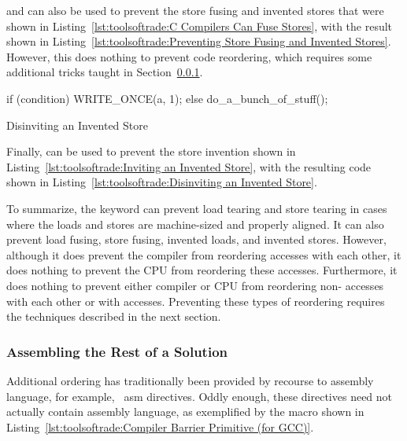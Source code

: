  and  can also be used to prevent the
store fusing and invented stores that were shown in
Listing~\ref{lst:toolsoftrade:C Compilers Can Fuse Stores},
with the result shown in
Listing~\ref{lst:toolsoftrade:Preventing Store Fusing and Invented Stores}.
However, this does nothing to prevent code reordering, which requires
some additional tricks taught in
Section~\ref{sec:toolsoftrade:Assembling the Rest of a Solution}.

\begin{listing}[tbp]
\begin{linelabel}
\begin{VerbatimL}[commandchars=\\\{\}]
if (condition)
	WRITE_ONCE(a, 1);
else
	do_a_bunch_of_stuff();
\end{VerbatimL}
\end{linelabel}
\caption{Disinviting an Invented Store}
\label{lst:toolsoftrade:Disinviting an Invented Store}
\end{listing}

Finally,  can be used to prevent the store invention
shown in
Listing~\ref{lst:toolsoftrade:Inviting an Invented Store},
with the resulting code shown in
Listing~\ref{lst:toolsoftrade:Disinviting an Invented Store}.

To summarize, the  keyword can prevent load
tearing and store tearing in cases where the loads and stores are
machine-sized and properly aligned.
It can also prevent load fusing, store fusing, invented loads, and
invented stores.
However, although it does prevent the compiler from reordering 
accesses with each other, it does nothing to prevent the
CPU from reordering these accesses.
Furthermore, it does nothing to prevent either compiler or CPU from
reordering non- accesses with each other or with
 accesses.
Preventing these types of reordering requires the techniques described
in the next section.

\subsubsection{Assembling the Rest of a Solution}
\label{sec:toolsoftrade:Assembling the Rest of a Solution}

Additional ordering has traditionally been provided by recourse to
assembly language, for example, \GCC\ asm directives.
Oddly enough, these directives need not actually contain assembly language,
as exemplified by the  macro shown in
Listing~\ref{lst:toolsoftrade:Compiler Barrier Primitive (for GCC)}.

